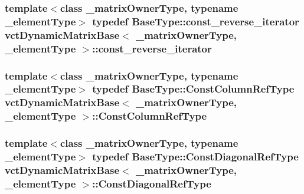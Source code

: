 \subsubsection[{const\+\_\+reverse\+\_\+iterator}]{\setlength{\rightskip}{0pt plus 5cm}template$<$class \+\_\+matrix\+Owner\+Type, typename \+\_\+element\+Type$>$ typedef {\bf Base\+Type\+::const\+\_\+reverse\+\_\+iterator} {\bf vct\+Dynamic\+Matrix\+Base}$<$ \+\_\+matrix\+Owner\+Type, \+\_\+element\+Type $>$\+::{\bf const\+\_\+reverse\+\_\+iterator}}\label{classvct_dynamic_matrix_base_a98a8a7626647cf9dfef10d6b7f7cc9af}
\hypertarget{classvct_dynamic_matrix_base_a744dadc203a40ef15678bca262d09aad}{}
\subsubsection[{Const\+Column\+Ref\+Type}]{\setlength{\rightskip}{0pt plus 5cm}template$<$class \+\_\+matrix\+Owner\+Type, typename \+\_\+element\+Type$>$ typedef {\bf Base\+Type\+::\+Const\+Column\+Ref\+Type} {\bf vct\+Dynamic\+Matrix\+Base}$<$ \+\_\+matrix\+Owner\+Type, \+\_\+element\+Type $>$\+::{\bf Const\+Column\+Ref\+Type}}\label{classvct_dynamic_matrix_base_a744dadc203a40ef15678bca262d09aad}
\hypertarget{classvct_dynamic_matrix_base_ade45bdec8e92cad6e570939dc15d5450}{}
\subsubsection[{Const\+Diagonal\+Ref\+Type}]{\setlength{\rightskip}{0pt plus 5cm}template$<$class \+\_\+matrix\+Owner\+Type, typename \+\_\+element\+Type$>$ typedef {\bf Base\+Type\+::\+Const\+Diagonal\+Ref\+Type} {\bf vct\+Dynamic\+Matrix\+Base}$<$ \+\_\+matrix\+Owner\+Type, \+\_\+element\+Type $>$\+::{\bf Const\+Diagonal\+Ref\+Type}}\label{classvct_dynamic_matrix_base_ade45bdec8e92cad6e570939dc15d5450}
\hypertarget{classvct_dynamic_matrix_base_a31dd42ab337cbc881f843c09aa141288}{}
